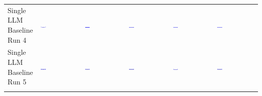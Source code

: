 \begin{table}
\begin{tabularx}{\textwidth}{@{}XXXXXX@{}}
    \makecell{Single LLM \\ Baseline \\ Run 4} & \includegraphics[width=0.13\textwidth]{./run_4/png/gpt-4o_results/ViaConnection.png} & \includegraphics[width=0.13\textwidth]{./run_4/png/o1-preview_results/ViaConnection.png} & \includegraphics[width=0.13\textwidth]{./run_4/png/claude-3-5-sonnet-20240620_results/ViaConnection.png} & \includegraphics[width=0.13\textwidth]{./run_4/png/watsonx_meta-llama_llama-3-1-70b-instruct_results/ViaConnection.png} & \includegraphics[width=0.13\textwidth]{./run_4/png/watsonx_meta-llama_llama-3-405b-instruct_results/ViaConnection.png} \\
    \makecell{Single LLM \\ Baseline \\ Run 5} & \includegraphics[width=0.13\textwidth]{./run_5/png/gpt-4o_results/ViaConnection.png} & \includegraphics[width=0.13\textwidth]{./run_5/png/o1-preview_results/ViaConnection.png} & \includegraphics[width=0.13\textwidth]{./run_5/png/claude-3-5-sonnet-20240620_results/ViaConnection.png} & \includegraphics[width=0.13\textwidth]{./run_5/png/watsonx_meta-llama_llama-3-1-70b-instruct_results/ViaConnection.png} & \includegraphics[width=0.13\textwidth]{./run_5/png/watsonx_meta-llama_llama-3-405b-instruct_results/ViaConnection.png} \\
    \bottomrule
  \end{tabular}

\end{tabularx}
\end{table}
